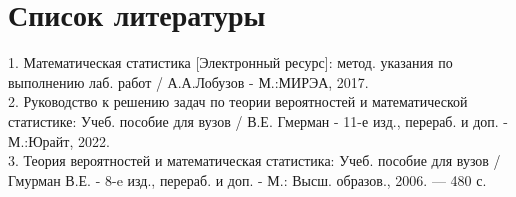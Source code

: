 \section{Список литературы}

1. Математическая статистика [Электронный ресурс]: 
метод. указания по выполнению лаб. работ / А.А.Лобузов - М.:МИРЭА, 2017. \\
2. Руководство к решению задач по теории вероятностей и математической статистике:
Учеб. пособие для вузов / В.Е. Гмерман - 11-е изд., перераб. и доп. - М.:Юрайт, 2022. \\
3.  Теория вероятностей и математическая статистика: Учеб. пособие
для вузов / Гмурман В.Е. - 8-e изд., перераб. и доп. - М.: Высш. образов., 2006. — 480 с. \\
